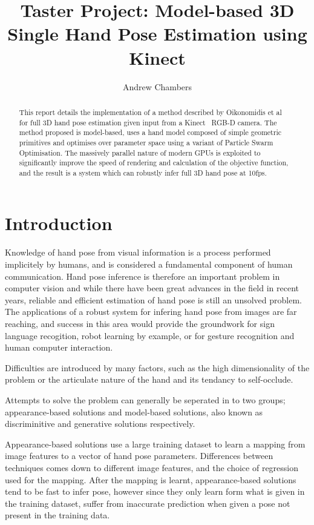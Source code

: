 \documentclass[10pt,a4paper,notitlepage,twocolumn]{report}
\date{}
\title{Taster Project: Model-based 3D Single Hand Pose Estimation using Kinect}
\author{Andrew Chambers}
\begin{document}
\maketitle

\begin{abstract}

	This report details the implementation of a method described by Oikonomidis et 
	al~\cite{bmvc2011oikonom} for full 3D hand pose estimation given input from a 
	Kinect~\cite{kinect} RGB-D camera.  The method proposed is model-based, uses a 
	hand model composed of simple geometric primitives and optimises over 
	parameter space using a variant of Particle Swarm Optimisation.  The massively 
	parallel nature of modern GPUs is exploited to significantly improve the speed 
	of rendering and calculation of the objective function, and the result is a 
	system which can robustly infer full 3D hand pose at 10fps.

\end{abstract}

\section{Introduction}

Knowledge of hand pose from visual information is a process performed 
implicitely by humans, and is considered a fundamental component of human 
communication.  Hand pose inference is therefore an important problem in 
computer vision and while there have been great advances in the field in recent 
years, reliable and efficient estimation of hand pose is still an unsolved 
problem.  The applications of a robust system for infering hand pose from images 
are far reaching, and success in this area would provide the groundwork for sign 
language recogition, robot learning by example, or for gesture recognition and 
human computer interaction.

Difficulties are introduced by many factors, such as the high dimensionality of 
the problem or the articulate nature of the hand and its tendancy to 
self-occlude.   

Attempts to solve the problem can generally be seperated in to two groups; 
appearance-based solutions and model-based solutions, also known as 
discriminitive and generative solutions respectively.  

Appearance-based solutions use a large training dataset to learn a mapping from 
image features to a vector of hand pose parameters.  Differences between 
techniques comes down to different image features, and the choice of regression 
used for the mapping.  After the mapping is learnt, appearance-based solutions 
tend to be fast to infer pose, however since they only learn form what is given 
in the training dataset, suffer from inaccurate prediction when given a pose not 
present in the training data.
\end{document}
